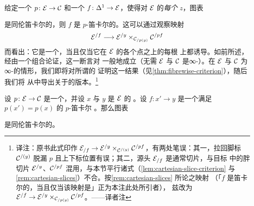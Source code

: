 \begin{remark}\label{rem:cartesian-characterization}
给定一个\trInnerFibration{} $p\colon \mathcal{E} \to \mathcal{C}$ 和一个\trMorphism{}%
$f\colon \Delta^1 \to \mathcal{E}$，使得对 $\mathcal{E}$ 的\emph{每个}\trObject{} $z$，图表
\begin{center}
\end{center}
是同伦笛卡尔的，则 $f$ 是 $p$-笛卡尔的。这可以通过观察映射
\[
\mathcal{E}^{/f} \longrightarrow \mathcal{E}^{/y} \times_{\mathcal{C}_{/p(y)}} \mathcal{C}^{/pf}
\]
而看出：它是一个\trTrivialFibration{}，当且仅当它在 $\mathcal{E}$ 的各个点之上的每根%
\trFibre{}上都诱导\trEquivalence{}。如前所述，经由一个组合论证，这一断言对%
\trRightFibration{}一般地成立（无需 $\mathcal{E}$ 与 $\mathcal{C}$ 是∞-\trCategories{}）。在
$\mathcal{E}$ 与 $\mathcal{C}$ 为∞-\trCategories{}的情形，我们即将对所谓的\trCartesianFibration{}%
证明这一结果（见\cref{thm:fibrewise-criterion}），随后我们将
从中导出关于\trRightFibration{}的版本。\footnote{译注：原书此式印作
$\mathcal{E}_{/f} \to \mathcal{E}^{/y} \times_{\mathcal{C}^{/(y)}} \mathcal{C}^{/pf}$，有两处笔误：其一，拉回脚标
$\mathcal{C}^{/(y)}$ 脱漏 $p$ 且上下标位置有误；其二，源头 $\mathcal{E}_{/f}$ 是通常切片，与目标
中的胖切片 $\mathcal{E}^{/y}$、$\mathcal{C}^{/pf}$ 混用，与本节平行诸式（\cref{lem:cartesian-slice-criterion}
与\cref{rem:cartesian-slices}）不合。按\cref{rem:cartesian-slices} 所论之映射
（「$f$ 是笛卡尔的，当且仅当该映射是\trTrivialFibration{}」正为本注此处所引者），
兹改为 $\mathcal{E}^{/f} \to \mathcal{E}^{/y} \times_{\mathcal{C}_{/p(y)}} \mathcal{C}^{/pf}$。——译者注}
\end{remark}

\begin{corollary}\label{cor:cartesian-lift-mapping-fibre}
设 $p\colon \mathcal{E} \to \mathcal{C}$ 是一个\trInnerFibration{}，并设 $x$ 与 $y$ 是 $\mathcal{E}$ 的%
\trObject{}。设 $f\colon x' \to y$ 是一个满足 $p(x') = p(x)$ 的 $p$-笛卡尔%
\trMorphism{}。那么图表
\begin{center}
\end{center}
是同伦笛卡尔的。
\end{corollary}

